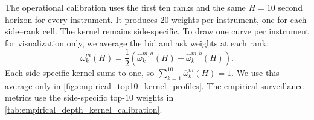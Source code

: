 \documentclass[11pt]{article}
\begin{document}
\FloatBarrier

The operational calibration uses the first ten ranks and the same $H=10$ second horizon for every instrument. It produces
20 weights per instrument, one for each side--rank cell. The kernel remains side-specific. To draw one curve per
instrument for visualization only, we average the bid and ask weights at each rank:
\begin{equation}
    \overline{\omega}^{m}_{k}(H)
    =
    \frac{1}{2}\left(
        \widehat\omega^{m,a}_{k}(H)
        +
        \widehat\omega^{m,b}_{k}(H)
    \right).
    \label{eq:side_averaged_empirical_kernel}
\end{equation}
Each side-specific kernel sums to one, so $\sum_{k=1}^{10}\overline{\omega}^{m}_{k}(H)=1$. We use this average only in
\cref{fig:empirical_top10_kernel_profiles}. The empirical surveillance metrics use the side-specific top-$10$ weights in
\cref{tab:empirical_depth_kernel_calibration}.
\end{document}
